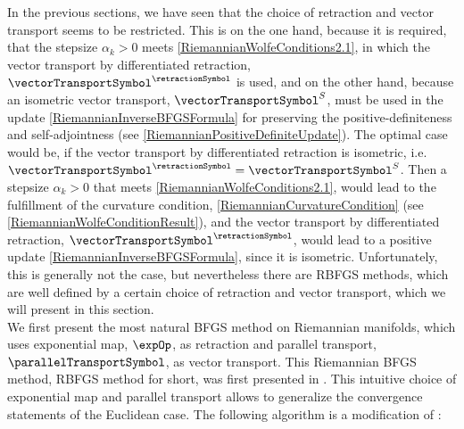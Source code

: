 In the previous sections, we have seen that the choice of retraction and vector transport seems to be restricted. This is on the one hand, because it is required, that the stepsize $\alpha_k > 0$ meets \cref{RiemannianWolfeConditions2.1}, in which the vector transport by differentiated retraction, $\vectorTransportSymbol^{\retractionSymbol}$ is used, and on the other hand, because an isometric vector transport, $\vectorTransportSymbol^{S}$, must be used in the update \cref{RiemannianInverseBFGSFormula} for preserving the positive-definiteness and self-adjointness (see \cref{RiemannianPositiveDefiniteUpdate}). The optimal case would be, if the vector transport by differentiated retraction is isometric, i.e. $\vectorTransportSymbol^{\retractionSymbol} = \vectorTransportSymbol^{S}$. Then a stepsize $\alpha_k > 0$ that meets \cref{RiemannianWolfeConditions2.1}, would lead to the fulfillment of the curvature condition, \cref{RiemannianCurvatureCondition} (see \cref{RiemannianWolfeConditionResult}), and the vector transport by differentiated retraction, $\vectorTransportSymbol^{\retractionSymbol}$, would lead to a positive update \cref{RiemannianInverseBFGSFormula}, since it is isometric. Unfortunately, this is generally not the case, but nevertheless there are RBFGS methods, which are well defined by a certain choice of retraction and vector transport, which we will present in this section. \\
We first present the most natural BFGS method on Riemannian manifolds, which uses exponential map, $\expOp$, as retraction and parallel transport, $\parallelTransportSymbol$, as vector transport. This Riemannian BFGS method, RBFGS method for short, was first presented in \cite{Gabay:1982}. This intuitive choice of exponential map and parallel transport allows to generalize the convergence statements of the Euclidean case. The following algorithm is a modification of \cite[Algorithm~2]{Qi:2011}:

